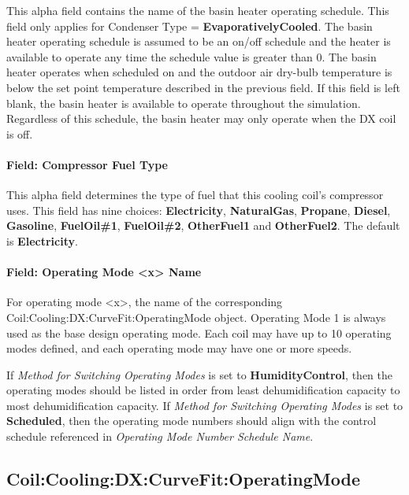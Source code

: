 This alpha field contains the name of the basin heater operating schedule. This field only applies for Condenser Type = \textbf{EvaporativelyCooled}. The basin heater operating schedule is assumed to be an on/off schedule and the heater is available to operate any time the schedule value is greater than 0. The basin heater operates when scheduled on and the outdoor air dry-bulb temperature is below the set point temperature described in the previous field. If this field is left blank, the basin heater is available to operate throughout the simulation. Regardless of this schedule, the basin heater may only operate when the DX coil is off.

\paragraph{Field: Compressor Fuel Type}\label{field-compressor-fuel-type-000}

This alpha field determines the type of fuel that this cooling coil's compressor uses. This field has nine choices: \textbf{Electricity}, \textbf{NaturalGas}, \textbf{Propane}, \textbf{Diesel}, \textbf{Gasoline}, \textbf{FuelOil\#1}, \textbf{FuelOil\#2}, \textbf{OtherFuel1} and \textbf{OtherFuel2}. The default is \textbf{Electricity}.

\paragraph{Field: Operating Mode \textless{}x\textgreater{} Name}\label{field-operating-mode-x-name}

For operating mode \textless{}x\textgreater{}, the name of the corresponding Coil:Cooling:DX:CurveFit:OperatingMode object. Operating Mode 1 is always used as the base design operating mode. Each coil may have up to 10 operating modes defined, and each operating mode may have one or more speeds.

If \textit{Method for Switching Operating Modes} is set to \textbf{HumidityControl}, then the operating modes should be listed in order from least dehumidification capacity to most dehumidification capacity. If \textit{Method for Switching Operating Modes} is set to \textbf{Scheduled}, then the operating mode numbers should align with the control schedule referenced in \textit{Operating Mode Number Schedule Name}.

\subsection{Coil:Cooling:DX:CurveFit:OperatingMode}\label{coilcoolingdxcurvefitoperatingmode}

